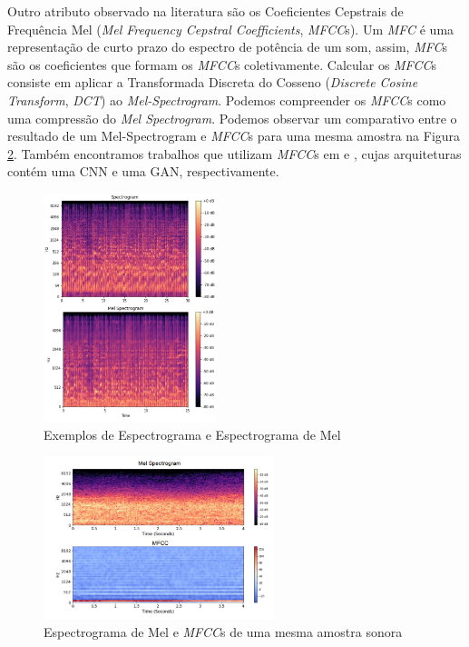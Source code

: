 Outro atributo observado na literatura são os Coeficientes Cepstrais de Frequência Mel (\textit{Mel Frequency Cepstral Coefficients}, \textit{MFCC}s). Um \textit{MFC} é uma representação de curto prazo do espectro de potência de um som, assim, \textit{MFC}s são os coeficientes que formam os \textit{MFCC}s coletivamente. Calcular os \textit{MFCC}s consiste em aplicar a Transformada Discreta do Cosseno (\textit{Discrete Cosine Transform}, \textit{DCT}) ao \textit{Mel-Spectrogram}. Podemos compreender os \textit{MFCC}s como uma compressão \cite{64} do \textit{Mel Spectrogram}. Podemos observar um comparativo entre o resultado de um Mel-Spectrogram e \textit{MFCC}s para uma mesma amostra na Figura \ref{fig:melspecvsmfcc}. Também encontramos trabalhos que utilizam \textit{MFCC}s em \cite{32.79} e \cite{32.89}, cujas arquiteturas contém uma CNN e uma GAN, respectivamente.

\begin{figure}[!h]
\centering
\includegraphics[width=0.45\textwidth]{imagens/espectrograma-vs-mel-espectrograma.png}
\caption{\label{fig:specvsmelespectrograma}Exemplos de Espectrograma e Espectrograma de Mel}
\end{figure}

\begin{figure}[!h]
\centering
\includegraphics[width=0.6\textwidth]{imagens/melspec-vs-mfcc.PNG}
\caption{\label{fig:melspecvsmfcc}Espectrograma de Mel e \textit{MFCC}s de uma mesma amostra sonora}

\author{Fonte: Imagem adaptada de \cite{64}}
\end{figure}

